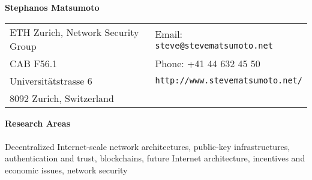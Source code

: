\documentclass[11pt]{article}
\begin{document}
\pagestyle{empty}

{\noindent\huge\bf Stephanos Matsumoto}

\vspace{4mm}

\begin{table}[h]
  \centering
  \begin{tabular}{p{0.5\linewidth}p{0.5\linewidth}}
    ETH Zurich, Network Security Group & Email: \verb+steve@stevematsumoto.net+\\
    CAB F56.1 & Phone: +41 44 632 45 50\\
    Universit\"{a}tstrasse 6 & \verb+http://www.stevematsumoto.net/+\\
    8092 Zurich, Switzerland &\\
  \end{tabular}
\end{table}

{\noindent\Large\textbf{Research Areas}}\\\\
Decentralized Internet-scale network architectures, public-key infrastructures,
authentication and trust, blockchains, future Internet architecture, incentives
and economic issues, network security
\end{document}
